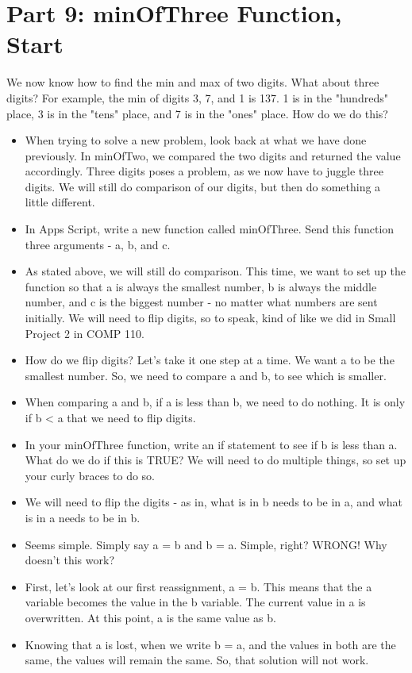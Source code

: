 \documentclass{article}
\begin{document}
\section*{Part 9: minOfThree Function, Start}
We now know how to find the min and max of two digits.  What about three digits?  For example, the min of digits 3, 7, and 1 is 137.  1 is in the "hundreds" place, 3 is in the "tens" place, and 7 is in the "ones" place.  How do we do this?
 \begin{itemize}
	\item When trying to solve a new problem, look back at what we have done previously.  In minOfTwo, we compared the two digits and returned the value accordingly.  Three digits poses a problem, as we now have to juggle three digits.  We will still do comparison of our digits, but then do something a little different.
	\item In Apps Script, write a new function called minOfThree.  Send this function three arguments - a, b, and c.
	\item As stated above, we will still do comparison.  This time, we want to set up the function so that a is always the smallest number, b is always the middle number, and c is the biggest number - no matter what numbers are sent initially.  We will need to flip digits, so to speak, kind of like we did in Small Project 2 in COMP 110.
	\item How do we flip digits?  Let's take it one step at a time.  We want a to be the smallest number.  So, we need to compare a and b, to see which is smaller.
	\item When comparing a and b, if a is less than b, we need to do nothing.  It is only if b < a that we need to flip digits.
	\item In your minOfThree function, write an if statement to see if b is less than a. What do we do if this is TRUE?  We will need to do multiple things, so set up your curly braces to do so.
	\item We will need to flip the digits - as in, what is in b needs to be in a, and what is in a needs to be in b.  
	\item Seems simple.  Simply say a = b and b = a.  Simple, right?  WRONG!  Why doesn't this work?
	\item First, let's look at our first reassignment, a = b.  This means that the a variable becomes the value in the b variable.  The current value in a is overwritten.  At this point, a is the same value as b.
	\item Knowing that a is lost, when we write b = a, and the values in both are the same, the values will remain the same.  So, that solution will not work.

\end{itemize}
\end{document}
